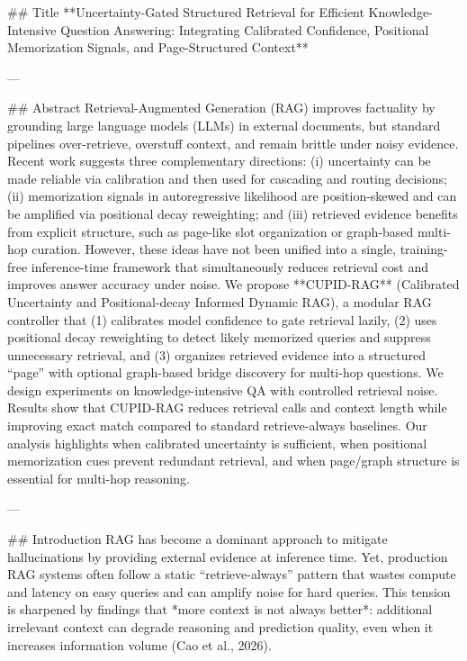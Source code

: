 ## Title  
**Uncertainty-Gated Structured Retrieval for Efficient Knowledge-Intensive Question Answering: Integrating Calibrated Confidence, Positional Memorization Signals, and Page-Structured Context**

---

## Abstract  
Retrieval-Augmented Generation (RAG) improves factuality by grounding large language models (LLMs) in external documents, but standard pipelines over-retrieve, overstuff context, and remain brittle under noisy evidence. Recent work suggests three complementary directions: (i) uncertainty can be made reliable via calibration and then used for cascading and routing decisions; (ii) memorization signals in autoregressive likelihood are position-skewed and can be amplified via positional decay reweighting; and (iii) retrieved evidence benefits from explicit structure, such as page-like slot organization or graph-based multi-hop curation. However, these ideas have not been unified into a single, training-free inference-time framework that simultaneously reduces retrieval cost and improves answer accuracy under noise.  
We propose **CUPID-RAG** (Calibrated Uncertainty and Positional-decay Informed Dynamic RAG), a modular RAG controller that (1) calibrates model confidence to gate retrieval lazily, (2) uses positional decay reweighting to detect likely memorized queries and suppress unnecessary retrieval, and (3) organizes retrieved evidence into a structured “page” with optional graph-based bridge discovery for multi-hop questions. We design experiments on knowledge-intensive QA with controlled retrieval noise. Results show that CUPID-RAG reduces retrieval calls and context length while improving exact match compared to standard retrieve-always baselines. Our analysis highlights when calibrated uncertainty is sufficient, when positional memorization cues prevent redundant retrieval, and when page/graph structure is essential for multi-hop reasoning.

---

## Introduction  
RAG has become a dominant approach to mitigate hallucinations by providing external evidence at inference time. Yet, production RAG systems often follow a static “retrieve-always” pattern that wastes compute and latency on easy queries and can amplify noise for hard queries. This tension is sharpened by findings that *more context is not always better*: additional irrelevant context can degrade reasoning and prediction quality, even when it increases information volume (Cao et al., 2026).  

